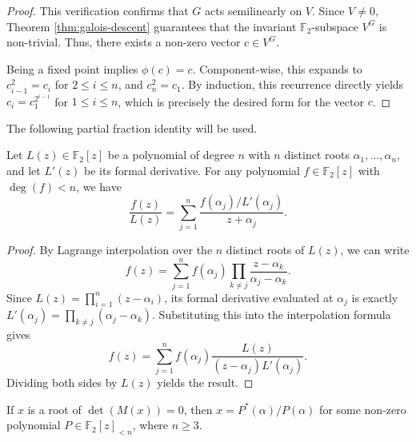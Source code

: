 \documentclass[hidelinks,onefignum,onetabnum]{siamart251216}
\theoremstyle{definition}
\theoremstyle{remark}
\begin{document}
\begin{proof}
	This verification confirms that $G$ acts semilinearly on $V$. Since $V\ne 0$,  Theorem \ref{thm:galois-descent} guarantees that the invariant $\mathbb{F}_2$-subspace $V^G$ is non-trivial. Thus, there exists a non-zero vector $c \in V^G$. 
	
	Being a fixed point implies $\phi(c) = c$. Component-wise, this expands to $c_{i-1}^2 = c_i$ for $2 \le i \le n$, and $c_n^2 = c_1$. By induction, this recurrence directly yields $c_i = c_1^{2^{i-1}}$ for $1 \le i \le n$, which is precisely the desired form for the vector $c$.
\end{proof}


 The following partial fraction identity will be used.


\begin{lemma}
	\label{lem:partial_fraction}
	Let $L(z) \in \mathbb{F}_2[z]$ be a polynomial of degree $n$ with $n$ distinct roots $\alpha_1, \dots, \alpha_n$, and let $L'(z)$ be its formal derivative. For any polynomial $f \in \mathbb{F}_2[z]$ with $\deg(f) < n$, we have
	\begin{equation}
		\frac{f(z)}{L(z)} = \sum_{j=1}^n \frac{f(\alpha_j)/L'(\alpha_j)}{z + \alpha_j}.
	\end{equation}
\end{lemma}

\begin{proof}
	By Lagrange interpolation over the $n$ distinct roots of $L(z)$, we can write
	\[
	f(z) = \sum_{j=1}^n f(\alpha_j) \prod_{k \neq j} \frac{z - \alpha_k}{\alpha_j - \alpha_k}.
	\]
	Since $L(z) = \prod_{i=1}^n (z - \alpha_i)$, its formal derivative evaluated at $\alpha_j$ is exactly $L'(\alpha_j) = \prod_{k \neq j} (\alpha_j - \alpha_k)$. Substituting this into the interpolation formula gives
	\[
	f(z) = \sum_{j=1}^n f(\alpha_j) \frac{L(z)}{(z - \alpha_j)L'(\alpha_j)}.
	\]
	Dividing both sides by $L(z)$ yields the result.
\end{proof}




\begin{proposition}
	\label{prop:root_form}
	If $x$ is a root of $\det(M(x)) = 0$, then $x = P^*(\alpha)/P(\alpha)$ for some non-zero polynomial $P \in \mathbb{F}_2[z]_{<n}$, where $n\ge 3$.
\end{proposition}
\end{document}
